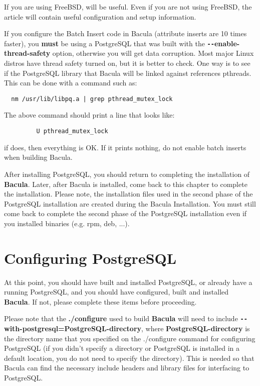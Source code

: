 If you are using FreeBSD, 
will be useful. Even if you are not using FreeBSD, the article will contain
useful configuration and setup information. 

If you configure the Batch Insert code in Bacula (attribute inserts are
10 times faster), you {\bf must} be using a PostgreSQL that was built with
the {\bf \verb:--:enable-thread-safety} option, otherwise you will get
data corruption. Most major Linux distros have thread safety turned on, but
it is better to check.  One way is to see if the PostgreSQL library that
Bacula will be linked against references pthreads.  This can be done
with a command such as:

\footnotesize
\begin{verbatim}
  nm /usr/lib/libpq.a | grep pthread_mutex_lock
\end{verbatim}
\normalsize

The above command should print a line that looks like:

\footnotesize
\begin{verbatim}
         U pthread_mutex_lock
\end{verbatim}
\normalsize

if does, then everything is OK. If it prints nothing, do not enable batch
inserts when building Bacula.

After installing PostgreSQL, you should return to completing the installation
of {\bf Bacula}. Later, after Bacula is installed, come back to this chapter
to complete the installation. Please note, the installation files used in the
second phase of the PostgreSQL installation are created during the Bacula
Installation. You must still come back to complete the second phase of the 
PostgreSQL installation even if you installed binaries (e.g. rpm, deb,
...).


\label{PostgreSQL_configure}
\section{Configuring PostgreSQL}

At this point, you should have built and installed PostgreSQL, or already have
a running PostgreSQL, and you should have configured, built and installed {\bf
Bacula}. If not, please complete these items before proceeding. 

Please note that the {\bf ./configure} used to build {\bf Bacula} will need to
include {\bf \verb:--:with-postgresql=PostgreSQL-directory}, where {\bf
PostgreSQL-directory} is the directory name that you specified on the
./configure command for configuring PostgreSQL (if you didn't specify a
directory or PostgreSQL is installed in a default location, you do not need to
specify the directory). This is needed so that Bacula can find the necessary
include headers and library files for interfacing to PostgreSQL. 

